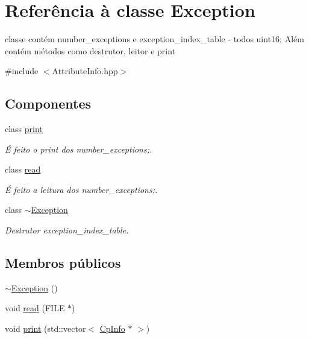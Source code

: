 \hypertarget{class_exception}{}\section{Referência à classe Exception}
\label{class_exception}


classe contém number\+\_\+exceptions e exception\+\_\+index\+\_\+table -\/ todos uint16; Além contém métodos como destrutor, leitor e print  




{\ttfamily \#include $<$Attribute\+Info.\+hpp$>$}

\subsection*{Componentes}
\begin{DoxyCompactItemize}
\item 
class \hyperlink{class_exception_1_1print}{print}
\begin{DoxyCompactList}\small\item\em É feito o print dos number\+\_\+exceptions;. \end{DoxyCompactList}\item 
class \hyperlink{class_exception_1_1read}{read}
\begin{DoxyCompactList}\small\item\em É feito a leitura dos number\+\_\+exceptions;. \end{DoxyCompactList}\item 
class \hyperlink{class_exception_1_1~_exception}{$\sim$\+Exception}
\begin{DoxyCompactList}\small\item\em Destrutor exception\+\_\+index\+\_\+table. \end{DoxyCompactList}\end{DoxyCompactItemize}
\subsection*{Membros públicos}
\begin{DoxyCompactItemize}
\item 
\hyperlink{class_exception_a6b214cd8627d0968bdeebc1fbb9556b8}{$\sim$\+Exception} ()
\item 
void \hyperlink{class_exception_ad660b6215e7a9df9b2d4bc5216c828c4}{read} (F\+I\+LE $\ast$)
\item 
void \hyperlink{class_exception_a87cfd1bc8493cb4b22d9d92a07132779}{print} (std\+::vector$<$ \hyperlink{class_cp_info}{Cp\+Info} $\ast$ $>$)
\end{DoxyCompactItemize}
